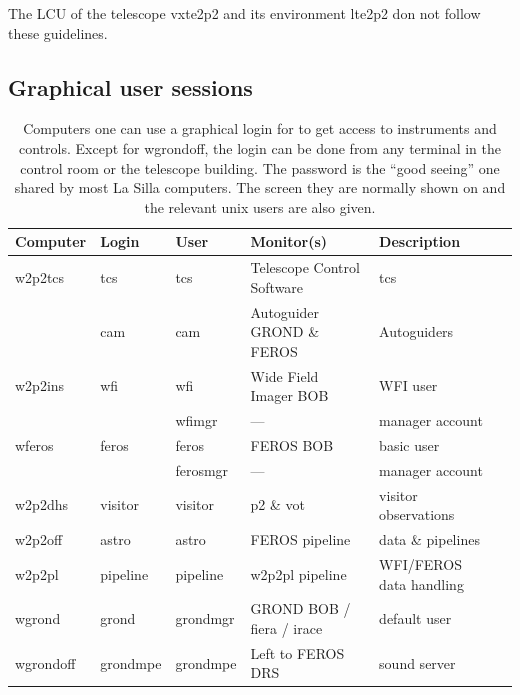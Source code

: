 \documentclass[11pt,fleqn,a4paper]{book}
\begin{document}
The LCU of the telescope \gls{vxte2p2} and its environment \gls{lte2p2} don not follow these guidelines.

\subsection{Graphical user sessions}
\begin{table}
    \caption[Main workstations and users]{Computers one can use a graphical login for to get access to instruments and controls. Except for wgrondoff, the login can be done from any terminal in the control room or the telescope building.  The password is the ``good seeing'' one shared by most  La Silla computers. The screen they are normally shown on and the relevant unix users are also given.  }
\label{fig:computers}
\centering
\begin{tabular}{llllll}
\hline
Computer        & Login    & User     & Monitor(s)                 & Description\\\hline\hline
\gls{w2p2tcs}   & tcs      & tcs      & Telescope Control Software & \gls{tcs}\\
                & cam      & cam      & Autoguider GROND \& FEROS  & Autoguiders\\
\gls{w2p2ins}   & wfi      & wfi      & Wide Field Imager BOB      & WFI user\\
                &          & wfimgr   & ---                        & manager account\\
\gls{wferos}    & feros    & feros    & FEROS BOB                  & basic user\\
                &          & ferosmgr & ---                        & manager account\\
\gls{w2p2dhs}   & visitor  & visitor  & \gls{p2} \& \gls{vot}      & \gls{visitor} observations\\
\gls{w2p2off}   & astro    & astro    & FEROS pipeline             & data \& pipelines\\
\gls{w2p2pl}    & pipeline & pipeline & w2p2pl pipeline            & WFI/FEROS data handling\\       
\gls{wgrond}    & grond    & grondmgr & GROND BOB / \gls{fiera} / \gls{irace}  & default user\\
\hline
\gls{wgrondoff} & grondmpe & grondmpe & Left to FEROS DRS          & sound server\\
\hline
\end{tabular}
\end{table}
\end{document}

